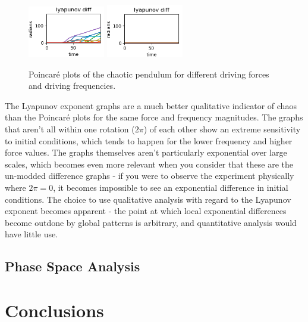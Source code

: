 \documentclass[11pt]{article} %
\begin{document}
\begin{figure}[H]
        \includegraphics[width=0.3\textwidth]{lya_2.0_1.0.png}
        \includegraphics[width=0.3\textwidth]{lya_2.0_2.0.png}
        \caption{Poincar\'e plots of the chaotic pendulum for different driving forces and driving frequencies.}
    \end{figure}
    The Lyapunov exponent graphs are a much better qualitative indicator of chaos than the Poincar\'e plots for the same force and frequency
    magnitudes. The graphs that aren't all within one rotation ($2\pi$) of each other show an extreme sensitivity to initial conditions, which
    tends to happen for the lower frequency and higher force values. The graphs themselves aren't particularly exponential over large scales, which
    becomes even more relevant when you consider that these are the un-modded difference graphs - if you were to observe the experiment physically
    where $2\pi = 0$, it becomes impossible to see an exponential difference in initial conditions. The choice to use qualitative analysis with regard
    to the Lyapunov exponent becomes apparent - the point at which local exponential differences become outdone by global patterns is arbitrary, and
    quantitative analysis would have little use.\\

    \subsection{Phase Space Analysis}
\section{Conclusions}

\end{document}
